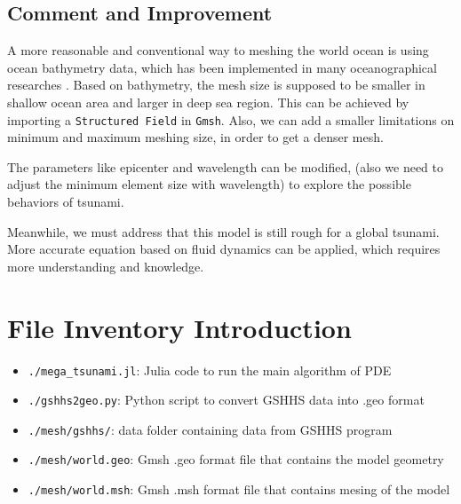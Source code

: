 \documentclass[a4paper]{article}
\begin{document}
\subsection{Comment and Improvement}
A more reasonable and conventional way to meshing the world ocean is using ocean bathymetry data\cite{amante2009etopo1}, which 
has been implemented in many oceanographical researches \cite{legrand2006high}. 
Based on bathymetry, the mesh size is supposed to be smaller in shallow ocean area and larger in deep sea region.
This can be achieved by importing a \verb|Structured Field| in \verb|Gmsh|.
Also, we can add a smaller limitations on minimum and maximum meshing size, in order to get a denser mesh.


The parameters like epicenter and wavelength can be modified, (also we need to adjust the minimum element size 
with wavelength) to explore the possible behaviors of tsunami.


Meanwhile, we must address that this model is still rough for a global tsunami. More accurate equation based on fluid dynamics
can be applied, which requires more understanding and knowledge.



\newpage




\appendix
\section{File Inventory Introduction}

\begin{itemize}
    \item \verb|./mega_tsunami.jl|:  Julia code to run the main algorithm of PDE
    \item \verb|./gshhs2geo.py|: Python script to convert GSHHS data into .geo format
    \item \verb|./mesh/gshhs/|: data folder containing data from GSHHS program
    \item \verb|./mesh/world.geo|: Gmsh .geo format file that contains the model geometry
    \item \verb|./mesh/world.msh|: Gmsh .msh format file that contains mesing of the model
\end{itemize}
\end{document}
